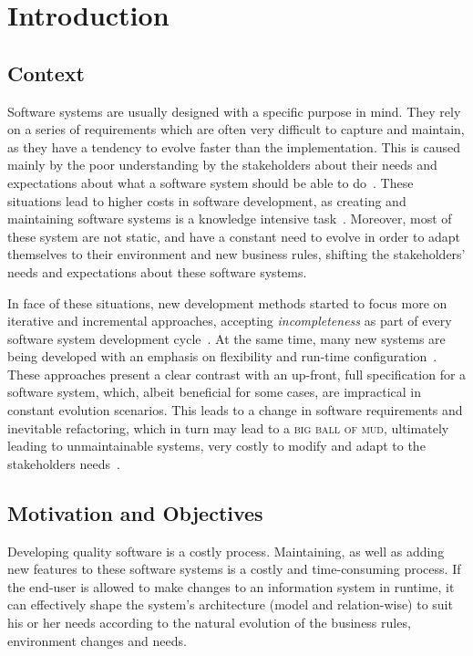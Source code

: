 \chapter{Introduction}\label{chap:intro}

\section{Context}\label{sec:context}

Software systems are usually designed with a specific purpose in mind. They rely on a series of requirements which are often very difficult to capture and maintain, as they have a tendency to evolve faster than the implementation. This is caused mainly by the poor understanding by the stakeholders about their needs and expectations about what a software system should be able to do~\cite{PT07}. These situations lead to higher costs in software development, as creating and maintaining software systems is a knowledge intensive task~\cite{AdOdSBD07}. Moreover, most of these system are not static, and have a constant need to evolve in order to adapt themselves to their environment and new business rules, shifting the stakeholders' needs and expectations about these software systems.

In face of these situations, new development methods started to focus more on iterative and incremental approaches, accepting \textit{incompleteness} as part of every software system development cycle~\cite{WC03}. At the same time, many new systems are being developed with an emphasis on flexibility and run-time configuration~\cite{YJ02}. These approaches present a clear contrast with an up-front, full specification for a software system, which, albeit beneficial for some cases, are impractical in constant evolution scenarios. This leads to a change in software requirements and inevitable refactoring, which in turn may lead to a \textsc{big ball of mud}, ultimately leading to unmaintainable systems, very costly to modify and adapt to the stakeholders needs~\cite{FY97}.

\section{Motivation and Objectives}\label{sec:goals}

Developing quality software is a costly process. Maintaining, as well as adding new features to these software systems is a costly and time-consuming process. If the end-user is allowed to make changes to an information system in runtime, it can effectively shape the system's architecture (model and relation-wise) to suit his or her needs according to the natural evolution of the business rules, environment changes and needs.

